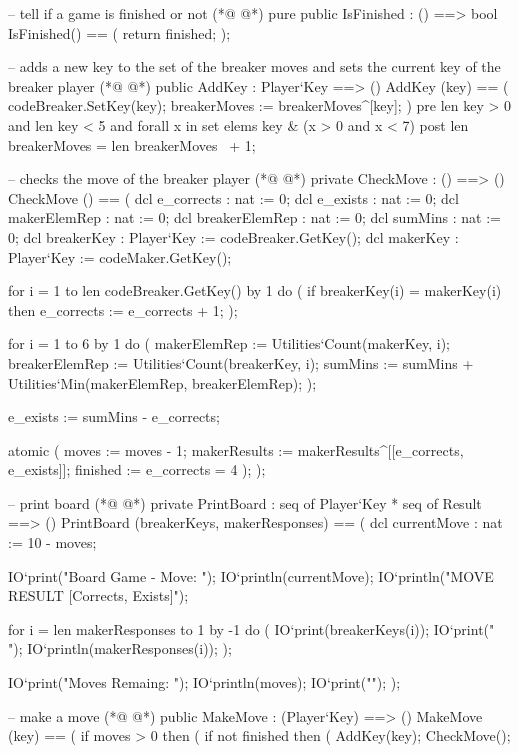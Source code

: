 \begin{vdmpp}[breaklines=true]
  -- tell if a game is finished or not
(*@
\label{IsFinished:67}
@*)
  pure public IsFinished : () ==> bool
   IsFinished() == (
    return finished;
   );
   
  -- adds a new key to the set of the breaker moves and sets the current key of the breaker player
(*@
\label{AddKey:73}
@*)
  public AddKey : Player`Key ==> ()
   AddKey (key) == (
    codeBreaker.SetKey(key);
    breakerMoves := breakerMoves^[key];
   )
  pre len key > 0 and len key < 5 and forall x in set elems key & (x > 0 and x < 7)
  post len breakerMoves = len breakerMoves~ + 1;
  
  -- checks the move of the breaker player
(*@
\label{CheckMove:82}
@*)
  private CheckMove : () ==> ()
  CheckMove () == (
   dcl e_corrects : nat := 0;
   dcl e_exists : nat := 0;
   dcl makerElemRep : nat := 0;
   dcl breakerElemRep : nat := 0;
   dcl sumMins : nat := 0;
   dcl breakerKey : Player`Key := codeBreaker.GetKey();
   dcl makerKey : Player`Key := codeMaker.GetKey();
  
   for i = 1 to len codeBreaker.GetKey() by 1 do (
     if breakerKey(i) = makerKey(i)
      then
       e_corrects := e_corrects + 1;
   );
   
   for i = 1 to 6 by 1 do (
    makerElemRep := Utilities`Count(makerKey, i);
    breakerElemRep := Utilities`Count(breakerKey, i);
    sumMins := sumMins + Utilities`Min(makerElemRep, breakerElemRep);
   );
   
   e_exists := sumMins - e_corrects;
   
   atomic (
    moves := moves - 1;
    makerResults := makerResults^[[e_corrects, e_exists]];
    finished := e_corrects = 4
   ); 
  );
   
  -- print board
(*@
\label{PrintBoard:114}
@*)
  private PrintBoard : seq of Player`Key * seq of Result ==> ()
   PrintBoard (breakerKeys, makerResponses) == (
    dcl currentMove : nat := 10 - moves;
   
    IO`print("Board Game - Move: ");
    IO`println(currentMove);
    IO`println("MOVE                 RESULT [Corrects, Exists]");
    
    for i = len makerResponses to 1 by -1 do (
     IO`print(breakerKeys(i));
     IO`print("         ");
     IO`println(makerResponses(i));
    );
    
    IO`print("Moves Remaing: ");
    IO`println(moves);
    IO`print("\n");
   );
   
  -- make a move
(*@
\label{MakeMove:134}
@*)
  public MakeMove : (Player`Key) ==> ()
   MakeMove (key) == (
   if moves > 0
    then (
     if not finished
      then (
       AddKey(key);
       CheckMove();
       

\end{vdmpp}

